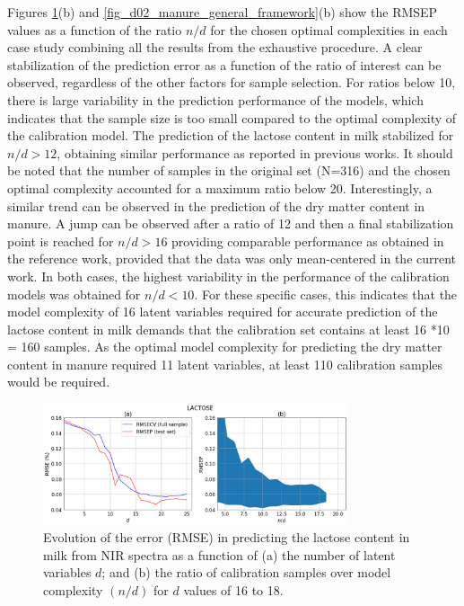 \documentclass[journal=ancham,manuscript=article]{achemso}
\begin{document}
Figures \ref{fig_d01_milk_general_framework}(b) and \ref{fig_d02_manure_general_framework}(b) show the RMSEP values as a function of the ratio $n/d$ for the chosen optimal complexities in each case study combining all the results from the exhaustive procedure. A clear stabilization of the prediction error as a function of the ratio of interest can be observed, regardless of the other factors for sample selection. For ratios below 10, there is large variability in the prediction performance of the models, which indicates that the sample size is too small compared to the optimal complexity of the calibration model. The prediction of the lactose content in milk stabilized for $n/d>12$, obtaining similar performance as reported in previous works\cite{Diaz-Olivares2020, Aernouts2011}. It should be noted that the number of samples in the original set (N=316) and the chosen optimal complexity accounted for a maximum ratio below 20. Interestingly, a similar trend can be observed in the prediction of the dry matter content in manure. A jump can be observed after a ratio of 12 and then a final stabilization point is reached for $n/d>16$ providing comparable performance as obtained in the reference work, provided that the data was only mean-centered in the current work\cite{Saeys2005}. In both cases, the highest variability in the performance of the calibration models was obtained for $n/d<10$. For these specific cases, this indicates that the model complexity of 16 latent variables required for accurate prediction of the lactose content in milk demands that the calibration set contains at least 16 *10 = 160 samples. As the optimal model complexity for predicting the dry matter content in manure required 11 latent variables, at least 110 calibration samples would be required.

\begin{figure}[b]
\includegraphics[width=0.8\textwidth]{manuscript/figures/d01_milk_general_framework.png}
\centering
\caption{Evolution of the error (RMSE) in predicting the lactose content in milk from NIR spectra as a function of (a) the number of latent variables $d$; and (b) the ratio of calibration samples over model complexity $(n/d)$ for $d$ values of 16 to 18.}
\label{fig_d01_milk_general_framework}
\end{figure}
\end{document}
